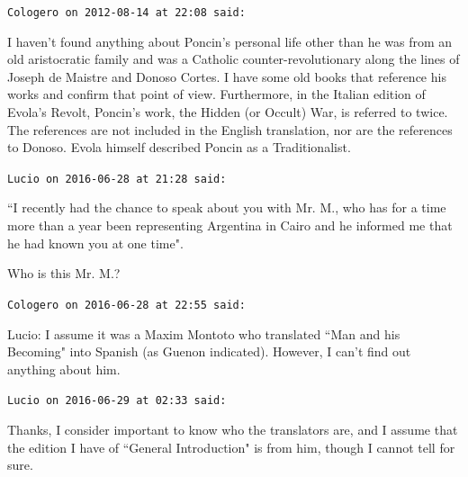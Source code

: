 \begin{footnotesize}
\begin{sffamily}
\hfill

\texttt{Cologero on 2012-08-14 at 22:08 said: }

I haven't found anything about Poncin's personal life other than he was from an old aristocratic family and was a Catholic counter-revolutionary along the lines of Joseph de Maistre and Donoso Cortes. I have some old books that reference his works and confirm that point of view. Furthermore, in the Italian edition of Evola's Revolt, Poncin's work, the Hidden (or Occult) War, is referred to twice. The references are not included in the English translation, nor are the references to Donoso. Evola himself described Poncin as a Traditionalist.


\hfill

\texttt{Lucio on 2016-06-28 at 21:28 said: }

``I recently had the chance to speak about you with Mr. M., who has for a time more than a year been representing Argentina in Cairo and he informed me that he had known you at one time".

Who is this Mr. M.?


\hfill

\texttt{Cologero on 2016-06-28 at 22:55 said: }

Lucio: I assume it was a Maxim Montoto who translated ``Man and his Becoming" into Spanish (as Guenon indicated). However, I can't find out anything about him.


\hfill

\texttt{Lucio on 2016-06-29 at 02:33 said: }

Thanks, I consider important to know who the translators are, and I assume that the edition I have of ``General Introduction" is from him, though I cannot tell for sure.


\end{sffamily}\end{footnotesize}
